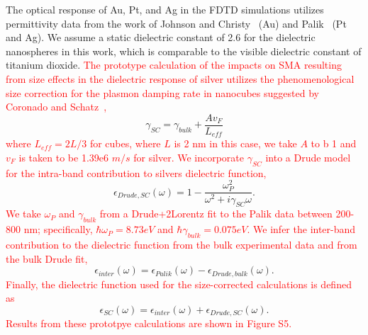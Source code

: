 \documentclass[journal=jpclcd,manuscript=suppinfo]{achemso}
\begin{document}
The optical response of Au, Pt, and Ag in the FDTD simulations utilizes permittivity 
data from the work of Johnson and Christy~\cite{JC_PRB_1972} (Au) and Palik~\cite{Palik} (Pt and Ag).  
We assume a static dielectric constant of 2.6 for
the dielectric nanospheres in this work, which is comparable to the visible dielectric constant of titanium dioxide. 
\textcolor{red}{The prototype calculation of the impacts on SMA resulting from size effects in the dielectric response
of silver utilizes the phenomenological size correction for the plasmon damping rate in nanocubes suggested by 
Coronado and Schatz~\cite{CS_JCP_2003},}
\begin{equation}
\gamma_{SC} = \gamma_{bulk} + \frac{A v_F}{L_{eff}}
\end{equation}
\textcolor{red}{where $L_{eff} = 2 L/3$ for cubes, where $L$ is 2 nm in this case, we take $A$ to b 1
and $v_F$ is taken to be 1.39e6 $m/s$ for silver.    
We incorporate $\gamma_{SC}$ into a Drude model for the intra-band contribution to silvers dielectric function,}
\begin{equation}
\epsilon_{Drude,SC}(\omega) = 1 - \frac{\omega_P^2}{\omega^2 + i\gamma_{SC}\omega}.
\end{equation}
\textcolor{red}{We take $\omega_P$ and $\gamma_{bulk}$ from a Drude+2Lorentz fit to the Palik data between 200-800 nm;
specifically, $\hbar \omega_P = 8.73 eV$ and $\hbar \gamma_{bulk} = 0.075 eV$.  We infer the
inter-band contribution to the dielectric function from the bulk experimental data and from the bulk Drude fit,}
\begin{equation}
\epsilon_{inter}(\omega) = \epsilon_{Palik}(\omega) - \epsilon_{Drude,bulk}(\omega).
\end{equation}
\textcolor{red}{Finally, the dielectric function used for the size-corrected calculations is defined as}
\begin{equation}
\epsilon_{SC}(\omega) = \epsilon_{inter}(\omega) + \epsilon_{Drude,SC}(\omega).
\end{equation}
\textcolor{red}{Results from these prototpye calculations are shown in Figure S5.}
 
\end{document}
